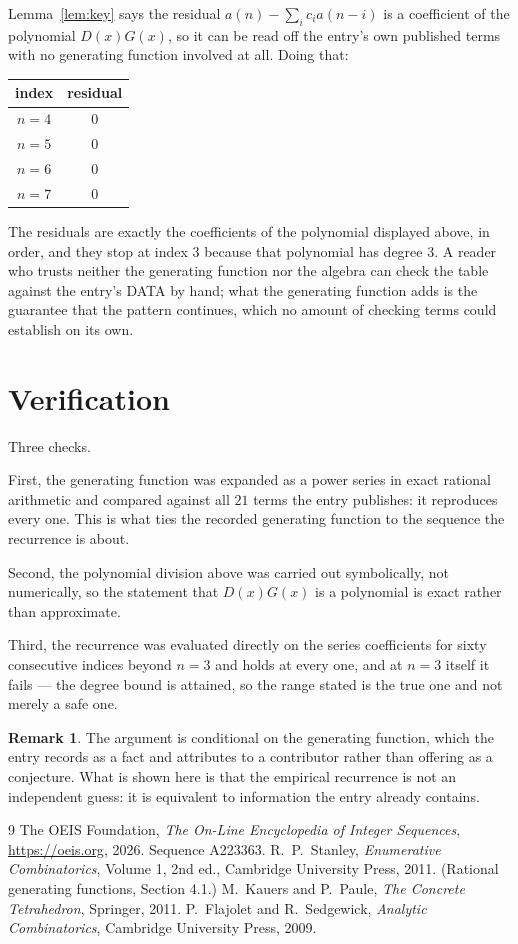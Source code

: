 \documentclass[11pt,a4paper]{article}
\theoremstyle{plain}
\theoremstyle{definition}
\newtheorem{remark}[theorem]{Remark}
\begin{document}
Lemma~\ref{lem:key} says the residual $a(n)-\sum_ic_ia(n-i)$ is a coefficient of the
polynomial $D(x)G(x)$, so it can be read off the entry's own published terms with no
generating function involved at all. Doing that:
\begin{center}
\begin{tabular}{cc}
index & residual \\ \hline
$n=4$ & $0$ \\
$n=5$ & $0$ \\
$n=6$ & $0$ \\
$n=7$ & $0$
\end{tabular}
\end{center}
The residuals are exactly the coefficients of the polynomial displayed above, in order, and
they stop at index $3$ because that polynomial has degree $3$. A reader who trusts
neither the generating function nor the algebra can check the table against the entry's DATA
by hand; what the generating function adds is the guarantee that the pattern continues, which
no amount of checking terms could establish on its own.

\section{Verification}

Three checks.

First, the generating function was expanded as a power series in exact rational arithmetic and
compared against all $21$ terms the entry publishes: it reproduces every one. This is
what ties the recorded generating function to the sequence the recurrence is about.

Second, the polynomial division above was carried out symbolically, not numerically, so the
statement that $D(x)G(x)$ is a polynomial is exact rather than approximate.

Third, the recurrence was evaluated directly on the series coefficients for sixty consecutive
indices beyond $n=3$ and holds at every one, and at $n=3$ itself it fails --- the
degree bound is attained, so the range stated is the true one and not merely a safe one.

\begin{remark}
The argument is conditional on the generating function, which the entry records as a fact and
attributes to a contributor rather than offering as a conjecture. What is shown here is that
the empirical recurrence is not an independent guess: it is equivalent to information the
entry already contains.
\end{remark}

\begin{thebibliography}{9}
 The OEIS Foundation, \emph{The On-Line Encyclopedia of Integer
Sequences}, \url{https://oeis.org}, 2026. Sequence A223363.
 R.~P.~Stanley, \emph{Enumerative Combinatorics}, Volume 1, 2nd ed.,
Cambridge University Press, 2011. (Rational generating functions, Section 4.1.)
 M.~Kauers and P.~Paule, \emph{The Concrete Tetrahedron}, Springer, 2011.
 P.~Flajolet and R.~Sedgewick, \emph{Analytic Combinatorics}, Cambridge
University Press, 2009.
\end{thebibliography}
\end{document}
